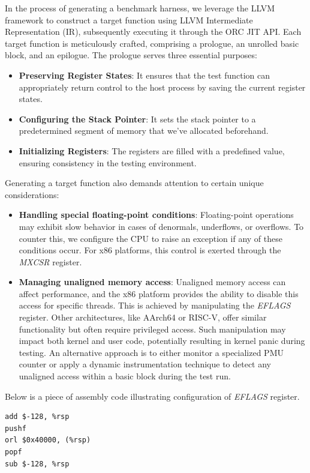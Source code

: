 In the process of generating a benchmark harness, we leverage the LLVM framework to construct a target 
function using LLVM Intermediate Representation (IR), subsequently executing it through the ORC JIT API. 
Each target function is meticulously crafted, comprising a prologue, an unrolled basic block, and an 
epilogue. The prologue serves three essential purposes:

\begin{itemize}
	\item \textbf{Preserving Register States}: It ensures that the test function can appropriately return
	       control to the host process by saving the current register states.
	\item \textbf{Configuring the Stack Pointer}: It sets the stack pointer to a predetermined segment of
	       memory that we've allocated beforehand.
	\item \textbf{Initializing Registers}: The registers are filled with a predefined value, ensuring
	       consistency in the testing environment.
\end{itemize}

Generating a target function also demands attention to certain unique considerations:
\begin{itemize}
	\item \textbf{Handling special floating-point conditions}: Floating-point operations may exhibit slow behavior in cases of denormals, underflows, or overflows. To counter this, we configure the CPU to raise an exception if any of these conditions occur. For x86 platforms, this control is exerted through the \textit{MXCSR} register.
	\item \textbf{Managing unaligned memory access}: Unaligned memory access can affect performance, and the x86 platform provides the ability to disable this access for specific threads. This is achieved by manipulating the \textit{EFLAGS} register. Other architectures, like AArch64 or RISC-V, offer similar functionality but often require privileged access. Such manipulation may impact both kernel and user code, potentially resulting in kernel panic during testing. An alternative approach is to either monitor a specialized PMU counter or apply a dynamic instrumentation technique to detect any unaligned access within a basic block during the test run.
\end{itemize}

Below is a piece of assembly code illustrating configuration of \textit{EFLAGS} register.

\begin{lstlisting}
add $-128, %rsp
pushf
orl $0x40000, (%rsp)
popf
sub $-128, %rsp
\end{lstlisting}

